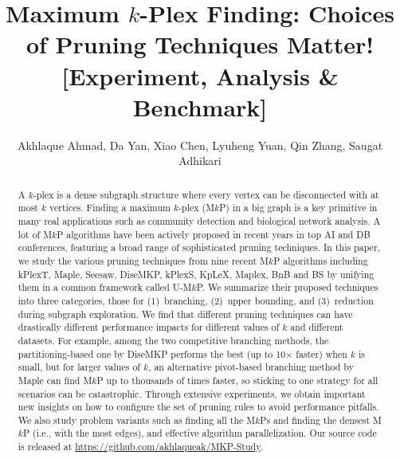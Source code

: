 \documentclass[sigconf, nonacm]{acmart}
\begin{document}
\title{Maximum $k$-Plex Finding: Choices of Pruning Techniques Matter! [Experiment, Analysis \& Benchmark]}


\author{Akhlaque Ahmad, Da Yan, Xiao Chen, Lyuheng Yuan, Qin Zhang, Saugat Adhikari}







\begin{abstract}
A $k$-plex is a dense subgraph structure where every vertex can be disconnected with at most $k$ vertices. Finding a maximum $k$-plex (M$k$P) in a big graph is a key primitive in many real applications such as community detection and biological network analysis. A lot of M$k$P algorithms have been actively proposed in recent years in top AI and DB conferences, featuring a broad range of sophisticated pruning techniques. In this paper, we study the various pruning techniques from nine recent M$k$P algorithms including kPlexT, Maple, Seesaw, DiseMKP, kPlexS, KpLeX, Maplex, BnB and BS by unifying them in a common framework called U-M$k$P. We summarize their proposed techniques into three categories, those for (1)~branching, (2)~upper bounding, and (3)~reduction during subgraph exploration. We find that different pruning techniques can have drastically different performance impacts for different values of $k$ and different datasets. For example, among the two competitive branching methods, the partitioning-based one by DiseMKP performs the best (up to 10$\times$ faster) when $k$ is small, but for larger values of $k$, an alternative pivot-based branching method by Maple can find M$k$P up to thousands of times faster, so sticking to one strategy for all scenarios can be catastrophic. Through extensive experiments, we obtain important new insights on how to configure the set of pruning rules to avoid performance pitfalls. We also study problem variants such as finding all the M$k$Ps and finding the densest M$k$P (i.e., with the most edges), and effective algorithm parallelization. 
Our source code is released at \url{https://github.com/akhlaqueak/MKP-Study}.
\end{abstract}
\end{document}
